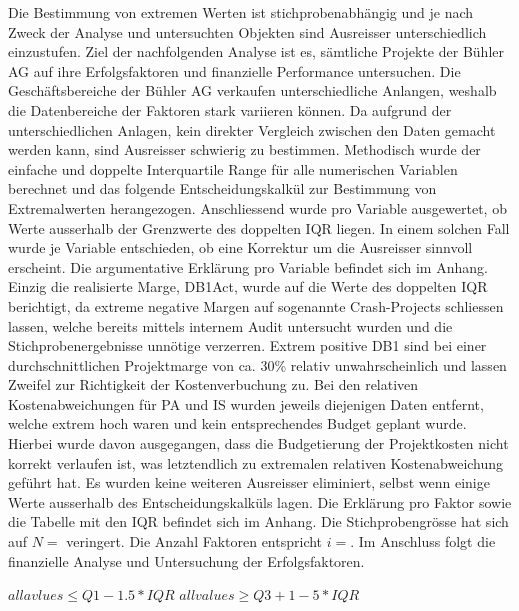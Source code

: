 Die Bestimmung von extremen Werten ist stichprobenabhängig und je nach Zweck der Analyse und untersuchten Objekten sind Ausreisser unterschiedlich einzustufen. Ziel der nachfolgenden Analyse ist es, sämtliche Projekte der Bühler AG auf ihre Erfolgsfaktoren und finanzielle Performance untersuchen. Die Geschäftsbereiche der Bühler AG verkaufen unterschiedliche Anlangen, weshalb die Datenbereiche der Faktoren stark variieren können. Da aufgrund der unterschiedlichen Anlagen, kein direkter Vergleich zwischen den Daten gemacht werden kann, sind Ausreisser schwierig zu bestimmen. Methodisch wurde der einfache und doppelte Interquartile Range für alle numerischen Variablen berechnet und das folgende Entscheidungskalkül zur Bestimmung von Extremalwerten herangezogen. Anschliessend wurde pro Variable ausgewertet, ob Werte ausserhalb der Grenzwerte des doppelten IQR liegen. In einem solchen Fall wurde je Variable entschieden, ob eine Korrektur um die Ausreisser sinnvoll erscheint. Die argumentative Erklärung pro Variable befindet sich im Anhang. Einzig die realisierte Marge, DB1Act, wurde auf die Werte des doppelten IQR berichtigt, da extreme negative Margen auf sogenannte Crash-Projects schliessen lassen, welche bereits mittels internem Audit untersucht wurden und die Stichprobenergebnisse unnötige verzerren. Extrem positive DB1 sind bei einer durchschnittlichen Projektmarge von ca. 30\% relativ unwahrscheinlich und lassen Zweifel zur Richtigkeit der Kostenverbuchung zu. Bei den  relativen Kostenabweichungen für PA und IS wurden jeweils diejenigen Daten entfernt, welche extrem hoch waren und kein entsprechendes Budget geplant wurde. Hierbei wurde davon ausgegangen, dass die Budgetierung der Projektkosten nicht korrekt verlaufen ist, was letztendlich zu extremalen relativen Kostenabweichung geführt hat. Es wurden keine weiteren Ausreisser eliminiert, selbst wenn einige Werte ausserhalb des Entscheidungskalküls lagen. Die Erklärung pro Faktor sowie die Tabelle mit den IQR befindet sich im Anhang. Die Stichprobengrösse hat sich auf $N = $ veringert. Die Anzahl Faktoren entspricht $ i = $. Im Anschluss folgt die finanzielle Analyse und Untersuchung der Erfolgsfaktoren. 
\newline\newline
\begin{centering}
		$ all avlues \leq Q1 - 1.5 * IQR$
		\newline
		$ all values \geq Q3 + 1-5 * IQR$
\end{centering}
\newline
\newline
